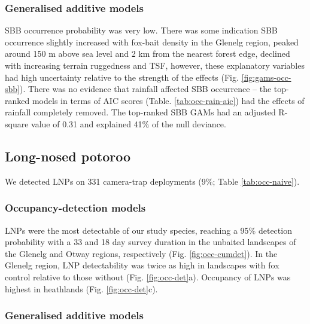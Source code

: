 \documentclass[11pt,a4paper,titlepage,twoside,openright]{style/unimelbthesis}
\begin{document}
\begin{mainmatter}
\hypertarget{generalised-additive-models-3}{%
\subsubsection{Generalised additive models}\label{generalised-additive-models-3}}

SBB occurrence probability was very low. There was some indication SBB occurrence slightly increased with fox-bait density in the Glenelg region, peaked around 150 m above sea level and 2 km from the nearest forest edge, declined with increasing terrain ruggedness and TSF, however, these explanatory variables had high uncertainty relative to the strength of the effects (Fig. \ref{fig:gams-occ-sbb}). There was no evidence that rainfall affected SBB occurrence -- the top-ranked models in terms of AIC scores (Table. \ref{tab:occ-rain-aic}) had the effects of rainfall completely removed. The top-ranked SBB GAMs had an adjusted R-square value of 0.31 and explained 41\% of the null deviance.

\hypertarget{long-nosed-potoroo-1}{%
\subsection{Long-nosed potoroo}\label{long-nosed-potoroo-1}}

We detected LNPs on 331 camera-trap deployments (9\%; Table \ref{tab:occ-naive}).

\hypertarget{occupancy-detection-models-4}{%
\subsubsection{Occupancy-detection models}\label{occupancy-detection-models-4}}

LNPs were the most detectable of our study species, reaching a 95\% detection probability with a 33 and 18 day survey duration in the unbaited landscapes of the Glenelg and Otway regions, respectively (Fig. \ref{fig:occ-cumdet}). In the Glenelg region, LNP detectability was twice as high in landscapes with fox control relative to those without (Fig. \ref{fig:occ-det}a). Occupancy of LNPs was highest in heathlands (Fig. \ref{fig:occ-det}c).

\hypertarget{generalised-additive-models-4}{%
\subsubsection{Generalised additive models}\label{generalised-additive-models-4}}


\end{mainmatter}
\end{document}

